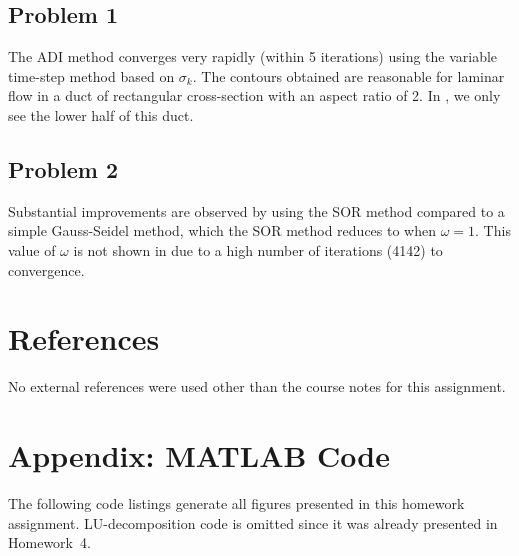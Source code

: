 \documentclass[11pt]{article}
\begin{document}
\subsection{Problem 1}

The ADI method converges very rapidly (within 5 iterations) using the variable time-step method based on $\sigma_k$. The contours obtained are reasonable for laminar flow in a duct of rectangular cross-section with an aspect ratio of 2. In , we only see the lower half of this duct.

\subsection{Problem 2}

Substantial improvements are observed by using the SOR method compared to a simple Gauss-Seidel method, which the SOR method reduces to when $\omega = 1$. This value of $\omega$ is not shown in  due to a high number of iterations (4142) to convergence.

\section{References} %

No external references were used other than the course notes for this assignment.

\section*{Appendix: MATLAB Code} %

The following code listings generate all figures presented in this homework assignment. LU-decomposition code is omitted since it was already presented in Homework~4.


\end{document}
